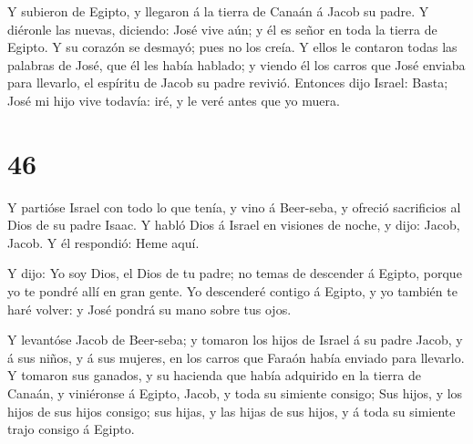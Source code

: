  Y subieron de Egipto, y llegaron á la tierra de Canaán á
Jacob su padre.  Y diéronle las nuevas, diciendo: José vive
aún; y él es señor en toda la tierra de Egipto. Y su corazón se desmayó;
pues no los creía.  Y ellos le contaron todas las palabras
de José, que él les había hablado; y viendo él los carros que José
enviaba para llevarlo, el espíritu de Jacob su padre revivió.
 Entonces dijo Israel: Basta; José mi hijo vive todavía:
iré, y le veré antes que yo muera.

\hypertarget{section-45}{%
\section{46}\label{section-45}}

 Y partióse Israel con todo lo que tenía, y vino á
Beer-seba, y ofreció sacrificios al Dios de su padre Isaac. 
Y habló Dios á Israel en visiones de noche, y dijo: Jacob, Jacob. Y él
respondió: Heme aquí.

 Y dijo: Yo soy Dios, el Dios de tu padre; no temas de
descender á Egipto, porque yo te pondré allí en gran gente. 
Yo descenderé contigo á Egipto, y yo también te haré volver: y José
pondrá su mano sobre tus ojos.

 Y levantóse Jacob de Beer-seba; y tomaron los hijos de
Israel á su padre Jacob, y á sus niños, y á sus mujeres, en los carros
que Faraón había enviado para llevarlo.  Y tomaron sus
ganados, y su hacienda que había adquirido en la tierra de Canaán, y
viniéronse á Egipto, Jacob, y toda su simiente consigo;  Sus
hijos, y los hijos de sus hijos consigo; sus hijas, y las hijas de sus
hijos, y á toda su simiente trajo consigo á Egipto.

